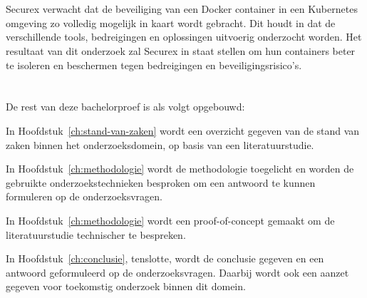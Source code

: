 \section{}%
\label{sec:onderzoeksdoelstelling}

Securex verwacht dat de beveiliging van een Docker container in een Kubernetes omgeving zo volledig mogelijk in kaart wordt gebracht. Dit houdt in dat de verschillende tools, bedreigingen en oplossingen uitvoerig onderzocht worden. Het resultaat van dit onderzoek zal Securex in staat stellen om hun containers beter te isoleren en beschermen tegen bedreigingen en beveiligingsrisico's.

\section{}%
\label{sec:opzet-bachelorproef}


De rest van deze bachelorproef is als volgt opgebouwd:

In Hoofdstuk~\ref{ch:stand-van-zaken} wordt een overzicht gegeven van de stand van zaken binnen het onderzoeksdomein, op basis van een literatuurstudie.

In Hoofdstuk~\ref{ch:methodologie} wordt de methodologie toegelicht en worden de gebruikte onderzoekstechnieken besproken om een antwoord te kunnen formuleren op de onderzoeksvragen.

In Hoofdstuk~\ref{ch:methodologie} wordt een proof-of-concept gemaakt om de literatuurstudie technischer te bespreken.

In Hoofdstuk~\ref{ch:conclusie}, tenslotte, wordt de conclusie gegeven en een antwoord geformuleerd op de onderzoeksvragen. Daarbij wordt ook een aanzet gegeven voor toekomstig onderzoek binnen dit domein.